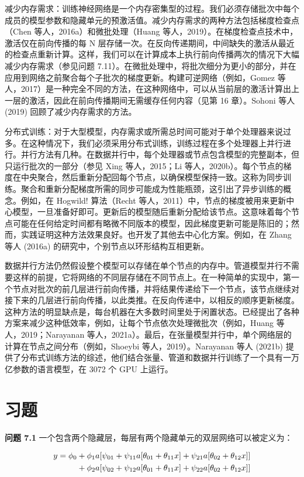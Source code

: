 \documentclass[lang=cn,newtx,10pt,scheme=chinese]{elegantbook}
\begin{document}
减少内存需求：训练神经网络是一个内存密集型的过程。我们必须存储批次中每个成员的模型参数和隐藏单元的预激活值。减少内存需求的两种方法包括梯度检查点（Chen 等人，2016a）和微批处理（Huang 等人，2019）。在梯度检查点技术中，激活仅在前向传播的每 N 层存储一次。在反向传递期间，中间缺失的激活从最近的检查点重新计算。这样，我们可以在计算成本上执行前向传播两次的情况下大幅减少内存需求（参见问题 7.11）。在微批处理中，将批次细分为更小的部分，并在应用到网络之前聚合每个子批次的梯度更新。构建可逆网络（例如，Gomez 等人，2017）是一种完全不同的方法，在这种网络中，可以从当前层的激活计算出上一层的激活，因此在前向传播期间无需缓存任何内容（见第 16 章）。Sohoni 等人 (2019) 回顾了减少内存需求的方法。

分布式训练：对于大型模型，内存需求或所需总时间可能对于单个处理器来说过多。在这种情况下，我们必须采用分布式训练，训练过程在多个处理器上并行进行。并行方法有几种。在数据并行中，每个处理器或节点包含模型的完整副本，但只运行批次的一部分（参见 Xing 等人，2015；Li 等人，2020b）。每个节点的梯度在中央聚合，然后重新分配回每个节点，以确保模型保持一致。这称为同步训练。聚合和重新分配梯度所需的同步可能成为性能瓶颈，这引出了异步训练的概念。例如，在 Hogwild! 算法（Recht 等人，2011）中，节点的梯度被用来更新中心模型，一旦准备好即可。更新后的模型随后重新分配给该节点。这意味着每个节点可能在任何给定时间都有略微不同版本的模型，因此梯度更新可能是陈旧的；然而，实践证明这种方法效果良好。也开发了其他去中心化方案。例如，在 Zhang 等人 (2016a) 的研究中，个别节点以环形结构互相更新。

数据并行方法仍然假设整个模型可以存储在单个节点的内存中。管道模型并行不需要这样的前提，它将网络的不同层存储在不同节点上。在一种简单的实现中，第一个节点对批次的前几层进行前向传播，并将结果传递给下一个节点，该节点继续对接下来的几层进行前向传播，以此类推。在反向传递中，以相反的顺序更新梯度。这种方法的明显缺点是，每台机器在大多数时间里处于闲置状态。已经提出了各种方案来减少这种低效率，例如，让每个节点依次处理微批次（例如，Huang 等人，2019；Narayanan 等人，2021a）。最后，在张量模型并行中，单个网络层的计算在节点之间分布（例如，Shoeybi 等人，2019）。Narayanan 等人 (2021b) 提供了分布式训练方法的综述，他们结合张量、管道和数据并行训练了一个具有一万亿参数的语言模型，在 3072 个 GPU 上运行。

\section{习题}  
\textbf{问题 7.1} 一个包含两个隐藏层，每层有两个隐藏单元的双层网络可以被定义为：

\begin{align}
y = \phi_0 &+ \phi_1a[\psi_{01} + \psi_{11}a[\theta_{01} + \theta_{11}x] + \psi_{21}a[\theta_{02} + \theta_{12}x]] \notag \\
&+ \phi_2a[\psi_{02} + \psi_{12}a[\theta_{01} + \theta_{11}x] + \psi_{22}a[\theta_{02} + \theta_{12}x]] 
\end{align} 
\end{document}
